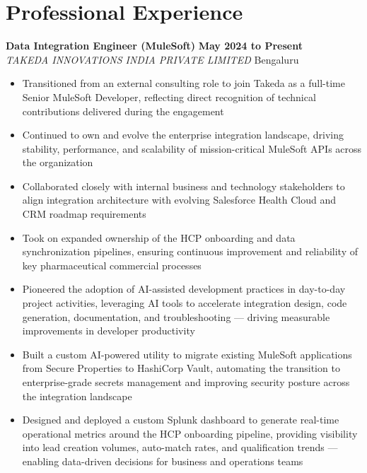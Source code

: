 \documentclass[11pt,a4paper]{article}
\begin{document}
\section{Professional Experience}
\textbf{Data Integration Engineer (MuleSoft)} \hfill \textbf{May 2024 to Present}\\
\textit{TAKEDA INNOVATIONS INDIA PRIVATE LIMITED} \hfill Bengaluru
\begin{itemize}
  \item Transitioned from an external consulting role to join Takeda as a full-time Senior MuleSoft Developer, reflecting direct recognition of technical contributions delivered during the engagement
  \item Continued to own and evolve the enterprise integration landscape, driving stability, performance, and scalability of mission-critical MuleSoft APIs across the organization
  \item Collaborated closely with internal business and technology stakeholders to align integration architecture with evolving Salesforce Health Cloud and CRM roadmap requirements
  \item Took on expanded ownership of the HCP onboarding and data synchronization pipelines, ensuring continuous improvement and reliability of key pharmaceutical commercial processes
  \item Pioneered the adoption of AI-assisted development practices in day-to-day project activities, leveraging AI tools to accelerate integration design, code generation, documentation, and troubleshooting — driving measurable improvements in developer productivity
  \item Built a custom AI-powered utility to migrate existing MuleSoft applications from Secure Properties to HashiCorp Vault, automating the transition to enterprise-grade secrets management and improving security posture across the integration landscape
  \item Designed and deployed a custom Splunk dashboard to generate real-time operational metrics around the HCP onboarding pipeline, providing visibility into lead creation volumes, auto-match rates, and qualification trends — enabling data-driven decisions for business and operations teams
\end{itemize}
\end{document}
